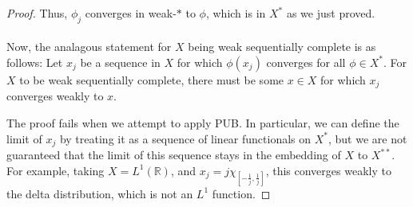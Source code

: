 \documentclass[fontsize=11pt]{scrartcl} %
\numberwithin{equation}{section} %
\numberwithin{figure}{section} %
\numberwithin{table}{section} %
\newcommand{\R}{\mathbb{R}}
\begin{document}
\begin{proof}
    Thus, $\phi_j$ converges in weak-$*$ to $\phi$, which is in $X^*$ as we just
    proved.
    \\
    \\
    Now, the analagous statement for $X$ being weak sequentially complete is as
    follows:
    Let $x_j$ be a sequence in $X$ for which $\phi(x_j)$ converges for all
    $\phi\in X^*$. For $X$ to be weak sequentially complete, there must be some
    $x\in X$ for which $x_j$ converges weakly to $x$.

    The proof fails when we attempt to apply PUB. In particular, we can define
    the limit of $x_j$ by treating it as a sequence of linear functionals on
    $X^*$, but we are not guaranteed that the limit of this sequence stays in
    the embedding of $X$ to $X^{**}$. For example, taking $X = L^1(\R)$, and
    $x_j = j\chi_{[-\frac{1}{j},\frac{1}{j}]}$, this converges weakly to the
    delta distribution, which is not an $L^1$ function.
\end{proof}
\end{document}
